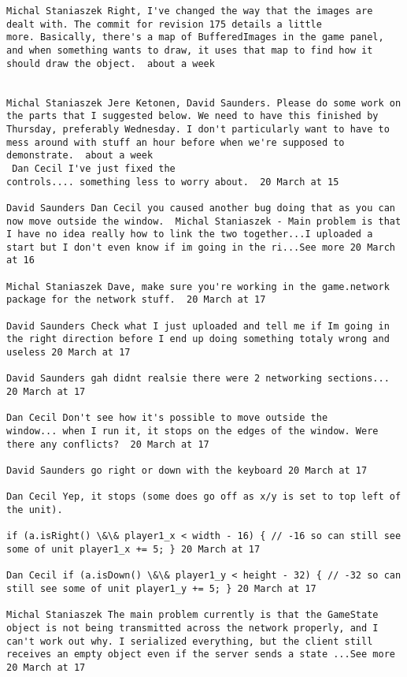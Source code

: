 \documentclass[10pt]{report}
\begin{document}
\begin{verbatim}
Michal Staniaszek Right, I've changed the way that the images are
dealt with. The commit for revision 175 details a little
more. Basically, there's a map of BufferedImages in the game panel,
and when something wants to draw, it uses that map to find how it
should draw the object.  about a week 


Michal Staniaszek Jere Ketonen, David Saunders. Please do some work on
the parts that I suggested below. We need to have this finished by
Thursday, preferably Wednesday. I don't particularly want to have to
mess around with stuff an hour before when we're supposed to
demonstrate.  about a week 
 Dan Cecil I've just fixed the
controls.... something less to worry about.  20 March at 15

David Saunders ‎Dan Cecil you caused another bug doing that as you can
now move outside the window.  Michal Staniaszek - Main problem is that
I have no idea really how to link the two together...I uploaded a
start but I don't even know if im going in the ri...See more 20 March
at 16

Michal Staniaszek Dave, make sure you're working in the game.network
package for the network stuff.  20 March at 17

David Saunders Check what I just uploaded and tell me if Im going in
the right direction before I end up doing something totaly wrong and
useless 20 March at 17

David Saunders gah didnt realsie there were 2 networking sections...
20 March at 17

Dan Cecil Don't see how it's possible to move outside the
window... when I run it, it stops on the edges of the window. Were
there any conflicts?  20 March at 17

David Saunders go right or down with the keyboard 20 March at 17

Dan Cecil Yep, it stops (some does go off as x/y is set to top left of
the unit).

if (a.isRight() \&\& player1_x < width - 16) { // -16 so can still see
some of unit player1_x += 5; } 20 March at 17

Dan Cecil if (a.isDown() \&\& player1_y < height - 32) { // -32 so can
still see some of unit player1_y += 5; } 20 March at 17

Michal Staniaszek The main problem currently is that the GameState
object is not being transmitted across the network properly, and I
can't work out why. I serialized everything, but the client still
receives an empty object even if the server sends a state ...See more
20 March at 17


\end{verbatim}
\end{document}
